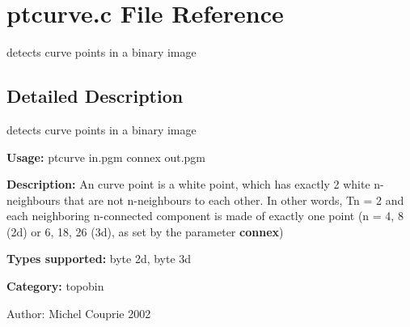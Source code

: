 \section{ptcurve.c File Reference}
\label{ptcurve_8c}
detects curve points in a binary image 



\subsection{Detailed Description}
detects curve points in a binary image 

{\bf Usage:} ptcurve in.pgm connex out.pgm

{\bf Description:} An curve point is a white point, which has exactly 2 white n-neighbours that are not n-neighbours to each other. In other words, Tn = 2 and each neighboring n-connected component is made of exactly one point (n = 4, 8 (2d) or 6, 18, 26 (3d), as set by the parameter {\bf connex})

{\bf Types supported:} byte 2d, byte 3d

{\bf Category:} topobin

\begin{Desc}
\item[Author:]Michel Couprie 2002 \end{Desc}
